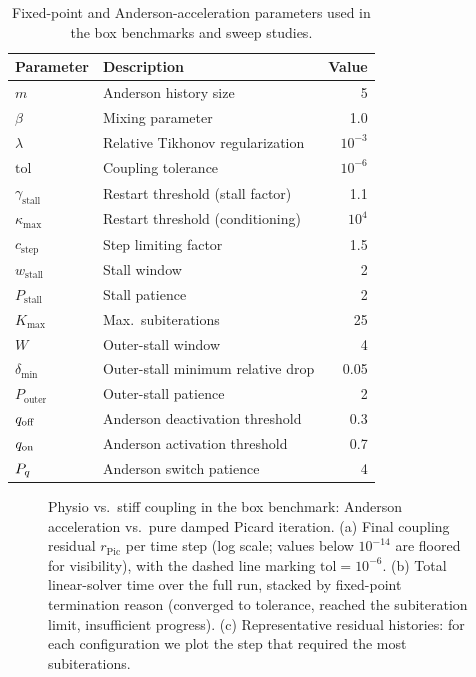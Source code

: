 \begin{table}[htbp]
  \centering
  \caption{Fixed-point and Anderson-acceleration parameters used in the box benchmarks and sweep studies.}
  \label{tab:anderson-params}
  \begin{tabular}{llr}
    \toprule
    \textbf{Parameter} & \textbf{Description} & \textbf{Value} \\
    \midrule
    $m$ & Anderson history size & 5 \\
    $\beta$ & Mixing parameter & 1.0 \\
    $\lambda$ & Relative Tikhonov regularization & $10^{-3}$ \\
    $\mathrm{tol}$ & Coupling tolerance & $10^{-6}$ \\
    $\gamma_{\mathrm{stall}}$ & Restart threshold (stall factor) & 1.1 \\
    $\kappa_{\max}$ & Restart threshold (conditioning) & $10^{4}$ \\
    $c_{\mathrm{step}}$ & Step limiting factor & 1.5 \\
    $w_{\mathrm{stall}}$ & Stall window & 2 \\
    $P_{\mathrm{stall}}$ & Stall patience & 2 \\
    $K_{\max}$ & Max.\ subiterations & 25 \\
    $W$ & Outer-stall window & 4 \\
    $\delta_{\min}$ & Outer-stall minimum relative drop & 0.05 \\
    $P_{\mathrm{outer}}$ & Outer-stall patience & 2 \\
    $q_{\mathrm{off}}$ & Anderson deactivation threshold & 0.3 \\
    $q_{\mathrm{on}}$ & Anderson activation threshold & 0.7 \\
    $P_{q}$ & Anderson switch patience & 4 \\
    \bottomrule
  \end{tabular}
\end{table}

  \begin{figure}[htbp]
  \centering
  \caption{Physio vs.\ stiff coupling in the box benchmark: Anderson acceleration vs.\ pure damped Picard iteration.
  (a) Final coupling residual $r_{\mathrm{Pic}}$ per time step (log scale; values below $10^{-14}$ are floored for visibility), with the dashed line marking $\mathrm{tol}=10^{-6}$.
  (b) Total linear-solver time over the full run, stacked by fixed-point termination reason (converged to tolerance, reached the subiteration limit, insufficient progress).
  (c) Representative residual histories: for each configuration we plot the step that required the most subiterations.}
  \label{fig:anderson_comparison}
\end{figure}
